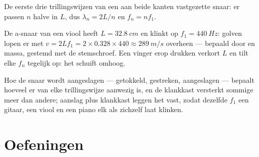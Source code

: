 \begin{omfigure}

{\small De eerste drie trillingswijzen van een aan beide kanten
vastgezette snaar: er passen $n$ halve  in $L$, dus
$\lambda_n = 2L/n$ en $f_n = nf_1$.}
\end{omfigure}

\begin{example}\label{ex:g12:sound-acoustics:violin}
De a-snaar van een viool heeft $L = \qty{32.8}{cm}$ en klinkt op
$f_1 = \qty{440}{Hz}$: golven lopen er met
$v = 2Lf_1 = 2 \times 0.328 \times 440 \approx \qty{289}{m/s}$ overheen
--- bepaald door  en massa, gestemd met de stemschroef. Een vinger
erop drukken verkort $L$ en tilt elke $f_n$ tegelijk op: het 
schuift omhoog.
\end{example}

\begin{remark}\label{rem:g12:sound-acoustics:instruments}
Hoe de snaar wordt aangeslagen --- getokkeld, gestreken, aangeslagen ---
bepaalt hoeveel er van elke trillingswijze aanwezig is, en de klankkast
versterkt sommige  meer dan andere; aanslag plus klankkast
leggen het  vast, zodat dezelfde $f_1$ een gitaar, een viool en
een piano elk als zichzelf laat klinken.
\end{remark}

\section{Oefeningen}

